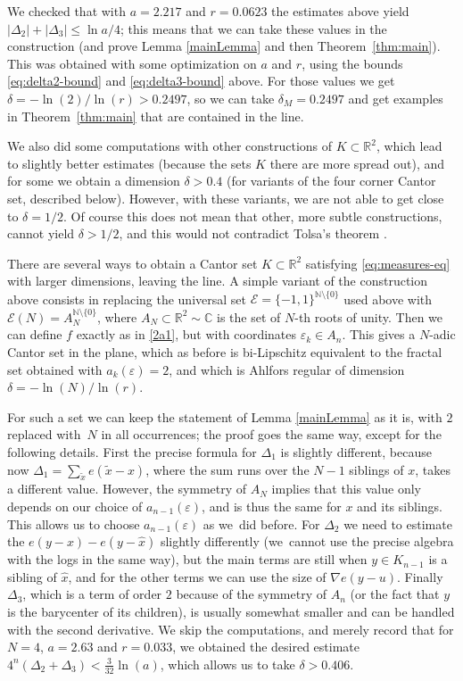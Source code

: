 \documentclass[JEP,XML,SOM,Unicode,published]{cedram}
\let\sm\setminus
\let\wt\widetilde
\let\wh\widehat
\numberwithin{equation}{section}
\theoremstyle{plain}
\theoremstyle{definition}
\newcommand{\R}{\mathbb{R}}
\let\sm\setminus
\newcommand{\R}{\mathbb{R}}
\newcommand{\bN}{\mathbb{N}}
\newcommand{\bC}{\mathbb{C}}
\newcommand{\cE}{{\mathcal E}}
\begin{document}
We checked that with $a= 2.217$ and $r= 0.0623$
the estimates above yield $|\Delta_2|+ |\Delta_3| \le \ln a/4$; this means that we can take
these values in the construction (and prove Lemma \ref{mainLemma} and then Theorem~\ref{thm:main}).
This was obtained with some optimization on $a$ and $r$, using the bounds \eqref{eq:delta2-bound}
and \eqref{eq:delta3-bound} above.
For those values we get $\delta = -\ln(2)/\ln(r)> 0.2497$, so we can take $\delta_M = 0.2497$
and get examples in Theorem~\ref{thm:main} that are contained in the line.

We also did some computations with other constructions of $K \subset \R^2$,
which lead to slightly better estimates (because the sets $K$ there are more spread out),
and for some we obtain a dimension $\delta > 0.4$ (for variants of the four corner Cantor set, described below).
However, with these variants, we are not able to get close to $\delta = 1/2$.
Of course this does not mean that other, more subtle constructions, cannot yield $\delta > 1/2$, and this would
not contradict Tolsa's theorem \cite{Tolsa2023ADreg}.

There are several ways to obtain a Cantor set $K \subset \R^2$ satisfying \eqref{eq:measures-eq}
with larger dimensions, leaving the line. A simple variant of the construction above consists in replacing
the universal set $\cE = \{ -1, 1 \}^{\bN \sm \{ 0 \}}$ used above with
$\cE(N) = A_N^{\bN \sm \{ 0 \}}$, where $A_N \subset \R^2 \sim \bC$ is the set of $N$-th roots of
unity. Then we can define $f$ exactly as in \eqref{2a1}, but with coordinates $\varepsilon_k \in A_n$.
This gives a $N$-adic Cantor set in the plane, which as before is bi-Lipschitz equivalent to the fractal set
obtained with $a_{k}(\varepsilon) = 2$, and which is Ahlfors regular of dimension $\delta = - \ln(N)/\ln(r)$.

For such a set we can keep the statement of Lemma \ref{mainLemma} as it is, with $2$ replaced
with~$N$ in all occurrences; the proof goes the same way, except for the following details.
First the precise formula for $\Delta_1$ is slightly different, because now
$\Delta_1 = \sum_{\wt x} e(\wt x-x)$, where the sum runs over the $N-1$ siblings of
$x$, takes a different value. However, the symmetry of $A_N$ implies that this value only depends on our choice of $a_{n-1}(\varepsilon)$, and is thus the same
for $x$ and its siblings. This allows us to choose $a_{n-1}(\varepsilon)$ as we~did before.
For $\Delta_2$ we need to estimate the $e(y-x) - e(y-\wh x)$ slightly differently (we~cannot use
the precise algebra with the logs in the same way), but the main terms are still when $y \in K_{n-1}$
is a sibling of $\wh x$, and for the other terms we can use the size of $\nabla e(y-u)$. Finally
$\Delta_3$, which is a term of order $2$ because of the symmetry of $A_n$ (or the fact that
$y$ is the barycenter of its children), is usually somewhat smaller and can be handled with the second derivative.
We skip the computations, and merely record that for $N=4$, $a=2.63$ and $r = 0.033$, we obtained
the desired estimate $4^n(\Delta_2+\Delta_3) < \frac{3}{32} \ln(a)$, which allows us to take $\delta > 0.406$.
\end{document}
